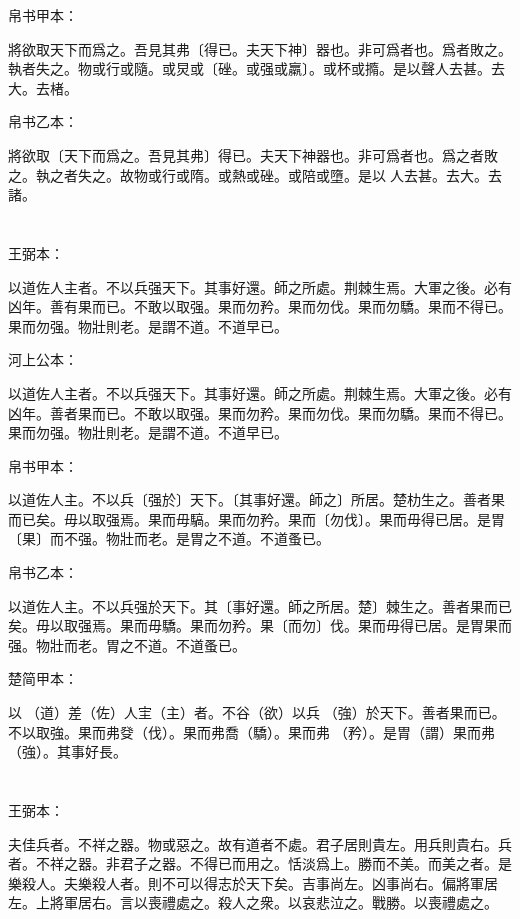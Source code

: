 \documentclass[a5paper]{ctexbook}
\begin{document}
    帛书甲本：

    將欲取天下而爲之。吾見其弗〔得已。夫天下神〕器也。非可爲者也。爲者敗之。執者失之。物或行或隨。或炅或〔䂳。或强或羸〕。或杯或撱。是以聲人去甚。去大。去楮。

    帛书乙本：

    將欲取〔天下而爲之。吾見其弗〕得已。夫天下神器也。非可爲者也。爲之者敗之。執之者失之。故物或行或隋。或熱或䂳。或陪或墮。是以𦔻人去甚。去大。去諸。

    \chapter{}
    王弼本：

    以道佐人主者。不以兵强天下。其事好還。師之所處。荆棘生焉。大軍之後。必有凶年。善有果而已。不敢以取强。果而勿矜。果而勿伐。果而勿驕。果而不得已。果而勿强。物壯則老。是謂不道。不道早已。

    河上公本：

    以道佐人主者。不以兵强天下。其事好還。師之所處。荆棘生焉。大軍之後。必有凶年。善者果而已。不敢以取强。果而勿矜。果而勿伐。果而勿驕。果而不得已。果而勿强。物壯則老。是謂不道。不道早已。

    帛书甲本：

    以道佐人主。不以兵〔强於〕天下。〔其事好還。師之〕所居。楚朸生之。善者果而已矣。毋以取强焉。果而毋䮦。果而勿矜。果而〔勿伐〕。果而毋得已居。是胃〔果〕而不强。物壯而老。是胃之不道。不道蚤已。

    帛书乙本：

    以道佐人主。不以兵强於天下。其〔事好還。師之所居。楚〕棘生之。善者果而已矣。毋以取强焉。果而毋驕。果而勿矜。果〔而勿〕伐。果而毋得已居。是胃果而强。物壯而老。胃之不道。不道蚤已。

    楚简甲本：

    以𧗟（道）差（佐）人宔（主）者。不谷（欲）以兵󶴘（強）於天下。善者果而已。不以取強。果而弗癹（伐）。果而弗喬（驕）。果而弗󶴙（矜）。是胃（謂）果而弗󶴘（強）。其事好長。

    \chapter{}
    王弼本：

    夫佳兵者。不祥之器。物或惡之。故有道者不處。君子居則貴左。用兵則貴右。兵者。不祥之器。非君子之器。不得已而用之。恬淡爲上。勝而不美。而美之者。是樂殺人。夫樂殺人者。則不可以得志於天下矣。吉事尚左。凶事尚右。偏將軍居左。上將軍居右。言以喪禮處之。殺人之衆。以哀悲泣之。戰勝。以喪禮處之。
\end{document}
